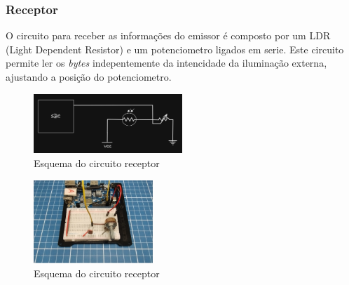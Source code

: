 \subsubsection{Receptor}

O circuito para receber as informações do emissor é composto por um LDR (Light Dependent Resistor) e um potenciometro ligados em serie. Este circuito permite ler os \emph{bytes} indepentemente da intencidade da iluminação externa, ajustando a posição do potenciometro.

\begin{figure}[!htbp]
  \includegraphics[width=0.5\textwidth]{images/esquema_circuito_receptor.png}
  \caption{Esquema do circuito receptor}
  \label{esquema-circuito-receptor}
\end{figure}


\begin{figure}[!htbp]
  \includegraphics[width=0.4\textwidth]{images/foto_circuito_receptor.jpg}
  \caption{Esquema do circuito receptor}
  \label{foto-circuito-receptor}
\end{figure}

